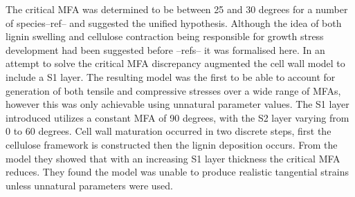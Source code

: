 The critical MFA was determined to be between
25 and 30 degrees for a number of species--ref-- \citep[in Japanese]{Okuyama_1993} and \citep{ISI:A1995QJ03000001} suggested the
unified hypothesis. Although the idea of both lignin swelling and cellulose
contraction being responsible for growth stress development had been suggested
before --refs-- it was formalised here. In an attempt to solve the critical MFA
discrepancy \citet{ISI:A1995QJ03000001} augmented the \citet{Barber_1964} cell wall
model to include a S1 layer. The resulting model was the first to be able to
account for generation of both tensile and compressive stresses over a wide
range of MFAs, however this was only achievable using unnatural parameter values. The S1 layer introduced utilizes a constant MFA
of 90 degrees, with the S2 layer varying from 0 to 60 degrees. Cell wall maturation
occurred in two discrete steps, first the cellulose framework is constructed then
the lignin deposition occurs. From the model they showed that with an
increasing S1 layer thickness the critical MFA reduces. They found the model
was unable to produce realistic tangential strains unless unnatural parameters
were used.